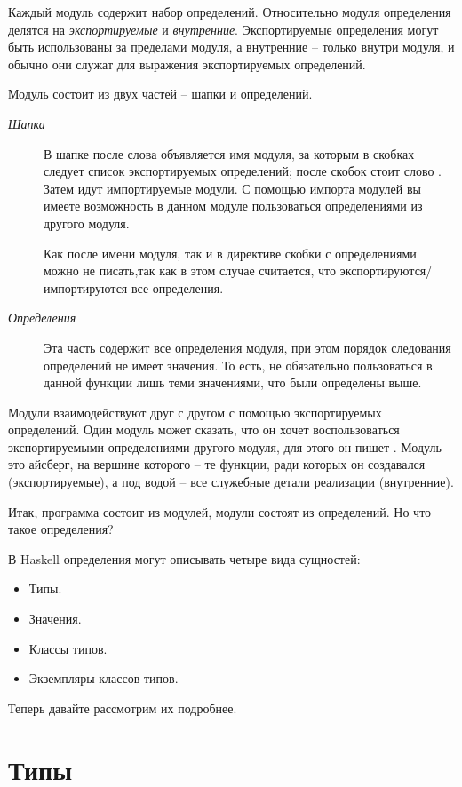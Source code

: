 Каждый модуль содержит набор определений. Относительно модуля
определения делятся на \emph{экспортируемые} и \emph{внутренние}.
Экспортируемые определения могут быть использованы за пределами модуля,
а внутренние -- только внутри модуля, и обычно они служат для выражения
экспортируемых определений.

Модуль состоит из двух частей -- шапки и определений.

\begin{description}
\item[\emph{Шапка}]
В шапке после слова  объявляется имя модуля, за которым в
скобках следует список экспортируемых определений; после скобок стоит
слово . Затем идут импортируемые модули. С помощью импорта
модулей вы имеете возможность в данном модуле пользоваться определениями
из другого модуля.

Как после имени модуля, так и в директиве  скобки с
определениями можно не писать,так как в этом случае считается, что
экспортируются/импортируются все определения.
\item[\emph{Определения}]
Эта часть содержит все определения модуля, при этом порядок следования
определений не имеет значения. То есть, не обязательно пользоваться в
данной функции лишь теми значениями, что были определены выше.
\end{description}

Модули взаимодействуют друг с другом с помощью экспортируемых
определений. Один модуль может сказать, что он хочет воспользоваться
экспортируемыми определениями другого модуля, для этого он пишет
. Модуль -- это айсберг, на вершине
которого -- те функции, ради которых он создавался (экспортируемые), а
под водой -- все служебные детали реализации (внутренние).

Итак, программа состоит из модулей, модули состоят из определений. Но
что такое определения?

В Haskell определения могут описывать четыре вида сущностей:

\begin{itemize}
\item
  Типы.
\item
  Значения.
\item
  Классы типов.
\item
  Экземпляры классов типов.
\end{itemize}

Теперь давайте рассмотрим их подробнее.

\section{Типы}

